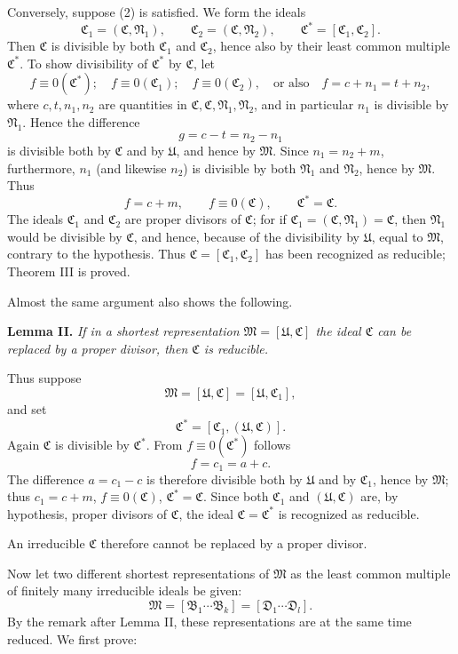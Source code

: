 \documentclass[11pt]{article}
\newcommand{\ideal}[1]{\mathfrak{#1}}
\begin{document}
Conversely, suppose (2) is satisfied. We form the ideals
\[
 \ideal C_1=(\ideal C,\ideal N_1),\qquad
 \ideal C_2=(\ideal C,\ideal N_2),\qquad
 \ideal C^*=[\ideal C_1,\ideal C_2].
\]
Then $\ideal C$ is divisible by both $\ideal C_1$ and $\ideal C_2$, hence also by their least common multiple $\ideal C^*$. To show divisibility of $\ideal C^*$ by $\ideal C$, let
\[
 f\equiv0(\ideal C^*);\quad f\equiv0(\ideal C_1);\quad f\equiv0(\ideal C_2),
 \quad\text{or also}\quad f=c+n_1=t+n_2,
\]
where $c,t,n_1,n_2$ are quantities in $\ideal C,\ideal C,\ideal N_1,\ideal N_2$, and in particular $n_1$ is divisible by $\ideal N_1$. Hence the difference
\[
 g=c-t=n_2-n_1
\]
is divisible both by $\ideal C$ and by $\ideal U$, and hence by $\ideal M$. Since $n_1=n_2+m$, furthermore, $n_1$ (and likewise $n_2$) is divisible by both $\ideal N_1$ and $\ideal N_2$, hence by $\ideal M$. Thus
\[
 f=c+m,
 \qquad f\equiv0(\ideal C),
 \qquad \ideal C^*=\ideal C.
\]
The ideals $\ideal C_1$ and $\ideal C_2$ are proper divisors of $\ideal C$; for if $\ideal C_1=(\ideal C,\ideal N_1)=\ideal C$, then $\ideal N_1$ would be divisible by $\ideal C$, and hence, because of the divisibility by $\ideal U$, equal to $\ideal M$, contrary to the hypothesis. Thus $\ideal C=[\ideal C_1,\ideal C_2]$ has been recognized as reducible; Theorem III is proved.

Almost the same argument also shows the following.

\textbf{Lemma II.} \emph{If in a shortest representation $\ideal M=[\ideal U,\ideal C]$ the ideal $\ideal C$ can be replaced by a proper divisor, then $\ideal C$ is reducible.}

Thus suppose
\[
 \ideal M=[\ideal U,\ideal C]=[\ideal U,\ideal C_1],
\]
and set
\[
 \ideal C^*=[\ideal C_1,(\ideal U,\ideal C)].
\]
Again $\ideal C$ is divisible by $\ideal C^*$. From $f\equiv0(\ideal C^*)$ follows
\[
 f=c_1=a+c.
\]
The difference $a=c_1-c$ is therefore divisible both by $\ideal U$ and by $\ideal C_1$, hence by $\ideal M$; thus $c_1=c+m$, $f\equiv0(\ideal C)$, $\ideal C^*=\ideal C$. Since both $\ideal C_1$ and $(\ideal U,\ideal C)$ are, by hypothesis, proper divisors of $\ideal C$, the ideal $\ideal C=\ideal C^*$ is recognized as reducible.

An irreducible $\ideal C$ therefore cannot be replaced by a proper divisor.

Now let two different shortest representations of $\ideal M$ as the least common multiple of finitely many irreducible ideals be given:
\[
 \ideal M=[\ideal B_1\cdots\ideal B_k]=[\ideal D_1\cdots\ideal D_l].
\]
By the remark after Lemma II, these representations are at the same time reduced. We first prove:
\end{document}
